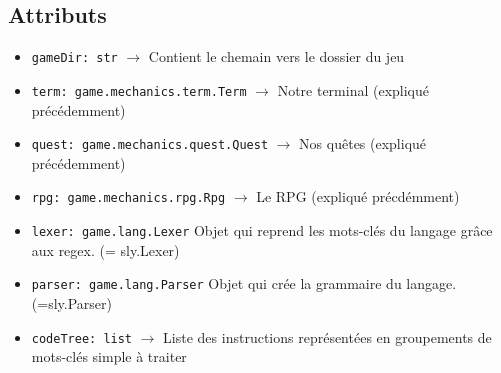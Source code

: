 \documentclass{report}
\begin{document}
\subsection*{Attributs}
\begin{itemize}
  \item \texttt{gameDir: str} $\rightarrow$ Contient le chemain vers le dossier du jeu
  \item \texttt{term: game.mechanics.term.Term} $\rightarrow$ Notre terminal (expliqué précédemment)
  \item \texttt{quest: game.mechanics.quest.Quest} $\rightarrow$ Nos quêtes (expliqué précédemment)
  \item \texttt{rpg: game.mechanics.rpg.Rpg} $\rightarrow$ Le RPG (expliqué précdémment)

  \item \texttt{lexer: game.lang.Lexer} Objet qui reprend les mots-clés du langage grâce aux regex. (= sly.Lexer)
  \item \texttt{parser: game.lang.Parser} Objet qui crée la grammaire du langage. (=sly.Parser)
  \item \texttt{codeTree: list} $\rightarrow$ Liste des instructions représentées en groupements de mots-clés simple à traiter


\end{itemize}
\end{document}
